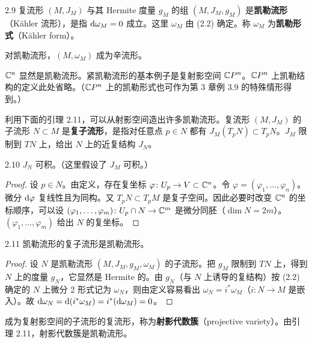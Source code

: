 \begin{definition}{2.9}
  复流形 $(M,J_M)$ 与其 Hermite 度量 $g_M$ 的组 $(M,J_M,g_M)$ 是\textbf{凯勒流形}（Kähler 流形），是指 $\mathrm{d}\omega_M=0$ 成立。这里 $\omega_M$ 由 (2.2) 确定。称 $\omega_M$ 为\textbf{凯勒形式}（Kähler form）。
\end{definition}

对凯勒流形，$(M,\omega_M)$ 成为辛流形。

$\mathbb{C}^n$ 显然是凯勒流形。紧凯勒流形的基本例子是复射影空间 $\mathbb{C}P^n$。$\mathbb{C}P^n$ 上凯勒结构的定义此处省略。（$\mathbb{C}P^n$ 上的凯勒形式也可作为第 3 章例 3.9 的特殊情形得到。）

利用下面的引理 2.11，可以从射影空间造出许多凯勒流形。复流形 $(M,J_M)$ 的子流形 $N\subset M$ 是\textbf{复子流形}，是指对任意点 $p\in N$ 都有 $J_M(T_pN)\subset T_pN$。$J_M$ 限制到 $TN$ 上，给出 $N$ 上的近复结构 $J_N$。

\begin{lemma*}{2.10}
  $J_N$ 可积。（这里假设了 $J_M$ 可积。）
\end{lemma*}

\begin{proof}
  设 $p\in N$。由定义，存在复坐标 $\varphi\colon U_p\to V\subset\mathbb{C}^n$。令 $\varphi=(\varphi_1,\dots,\varphi_n)$。微分 $\mathrm{d}\varphi$ 复线性且为同构。又 $T_pN\subset T_pM$ 是复子空间。因此必要时改变 $\mathbb{C}^n$ 的坐标顺序，可以设 $(\varphi_1,\dots,\varphi_m)\colon U_p\cap N\to\mathbb{C}^m$ 是微分同胚（$\dim N=2m$）。$(\varphi_1,\dots,\varphi_m)$ 给出 $N$ 的复坐标。
\end{proof}

\begin{lemma*}{2.11}
  凯勒流形的复子流形是凯勒流形。
\end{lemma*}

\begin{proof}
  设 $N$ 是凯勒流形 $(M,J_M,g_M,\omega_M)$ 的子流形。把 $g_M$ 限制到 $TN$ 上，得到 $N$ 上的度量 $g_N$，它显然是 Hermite 的。由 $g_N$（与 $N$ 上诱导的复结构）按 (2.2) 确定的 $N$ 上微分 2 形式记为 $\omega_N$，则由定义容易看出 $\omega_N=i^*\omega_M$（$i\colon N\to M$ 是嵌入）。故 $\mathrm{d}\omega_N=\mathrm{d}(i^*\omega_M)=i^*(\mathrm{d}\omega_M)=0$。
\end{proof}

成为复射影空间的子流形的复流形，称为\textbf{射影代数簇}（projective variety）。由引理 2.11，射影代数簇是凯勒流形。

